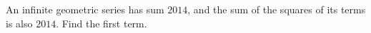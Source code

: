 An infinite geometric series has sum $2014$, and the sum of the squares of its terms is also $2014$. Find the first term.
